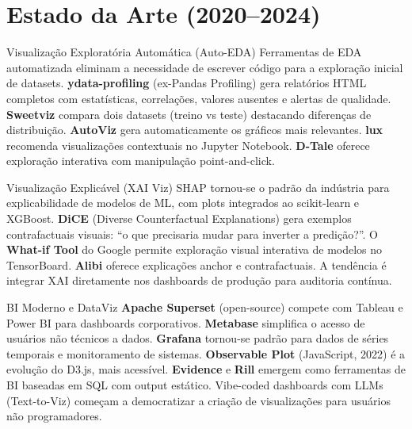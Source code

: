 \documentclass[12pt,a4paper]{article}
\begin{document}
\section{Estado da Arte (2020--2024)}

\begin{estadoartebox}{Visualização Exploratória Automática (Auto-EDA)}
Ferramentas de EDA automatizada eliminam a necessidade de escrever código para a exploração inicial de datasets. \textbf{ydata-profiling} (ex-Pandas Profiling) gera relatórios HTML completos com estatísticas, correlações, valores ausentes e alertas de qualidade. \textbf{Sweetviz} compara dois datasets (treino vs teste) destacando diferenças de distribuição. \textbf{AutoViz} gera automaticamente os gráficos mais relevantes. \textbf{lux} recomenda visualizações contextuais no Jupyter Notebook. \textbf{D-Tale} oferece exploração interativa com manipulação point-and-click.
\end{estadoartebox}

\begin{estadoartebox}{Visualização Explicável (XAI Viz)}
SHAP tornou-se o padrão da indústria para explicabilidade de modelos de ML, com plots integrados ao scikit-learn e XGBoost. \textbf{DiCE} (Diverse Counterfactual Explanations) gera exemplos contrafactuais visuais: ``o que precisaria mudar para inverter a predição?''. O \textbf{What-if Tool} do Google permite exploração visual interativa de modelos no TensorBoard. \textbf{Alibi} oferece explicações anchor e contrafactuais. A tendência é integrar XAI diretamente nos dashboards de produção para auditoria contínua.
\end{estadoartebox}

\begin{estadoartebox}{BI Moderno e DataViz}
\textbf{Apache Superset} (open-source) compete com Tableau e Power BI para dashboards corporativos. \textbf{Metabase} simplifica o acesso de usuários não técnicos a dados. \textbf{Grafana} tornou-se padrão para dados de séries temporais e monitoramento de sistemas. \textbf{Observable Plot} (JavaScript, 2022) é a evolução do D3.js, mais acessível. \textbf{Evidence} e \textbf{Rill} emergem como ferramentas de BI baseadas em SQL com output estático. Vibe-coded dashboards com LLMs (Text-to-Viz) começam a democratizar a criação de visualizações para usuários não programadores.
\end{estadoartebox}

\end{document}
